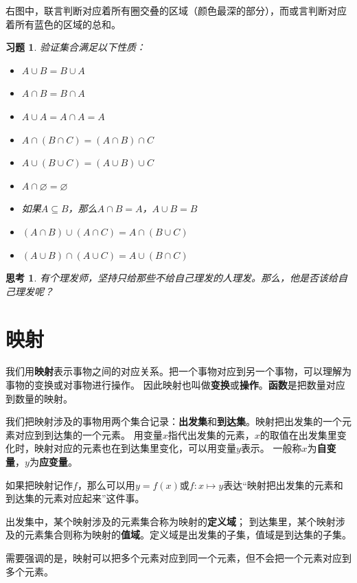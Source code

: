 \documentclass[12pt,UTF8]{ctexbook}
\newtheorem{sk}{思考}[section]
\newtheorem{xt}{习题}[section]
\begin{document}
右图中，联言判断对应着所有圈交叠的区域（颜色最深的部分），而或言判断对应着所有蓝色的区域的总和。

\begin{xt}\label{xt:2-0-0}
    验证集合满足以下性质：
    \begin{itemize}
        \item $A \cup B = B \cup A$
        \item $A \cap B = B \cap A$
        \item $A \cup A = A \cap A = A$
        \item $A \cap (B \cap C) = (A \cap B) \cap C$
        \item $A \cup (B \cup C) = (A \cup B) \cup C$
        \item $A \cap \varnothing = \varnothing$
        \item 如果$A \subseteq B$，那么$A \cap B = A$，$A \cup B = B$
        \item $(A \cap B) \cup (A \cap C) = A \cap (B \cup C)$
        \item $(A \cup B) \cap (A \cup C) = A \cup (B \cap C)$
    \end{itemize}  
\end{xt}

\begin{sk}\label{sk:2-0-1}
     有个理发师，坚持只给那些不给自己理发的人理发。那么，他是否该给自己理发呢？
\end{sk}

\section{映射}
我们用\textbf{映射}表示事物之间的对应关系。把一个事物对应到另一个事物，可以理解为事物的变换或对事物进行操作。
因此映射也叫做\textbf{变换}或\textbf{操作}。\textbf{函数}是把数量对应到数量的映射。

我们把映射涉及的事物用两个集合记录：\textbf{出发集}和\textbf{到达集}。映射把出发集的一个元素对应到到达集的一个元素。
用变量$x$指代出发集的元素，$x$的取值在出发集里变化时，映射对应的元素也在到达集里变化，可以用变量$y$表示。
一般称$x$为\textbf{自变量}，$y$为\textbf{应变量}。

如果把映射记作$f$，那么可以用$y = f(x)$或$f:x\mapsto y$表达“映射把出发集的元素和到达集的元素对应起来”这件事。

出发集中，某个映射涉及的元素集合称为映射的\textbf{定义域}；
到达集里，某个映射涉及的元素集合则称为映射的\textbf{值域}。定义域是出发集的子集，值域是到达集的子集。

需要强调的是，映射可以把多个元素对应到同一个元素，但不会把一个元素对应到多个元素。
\end{document}

